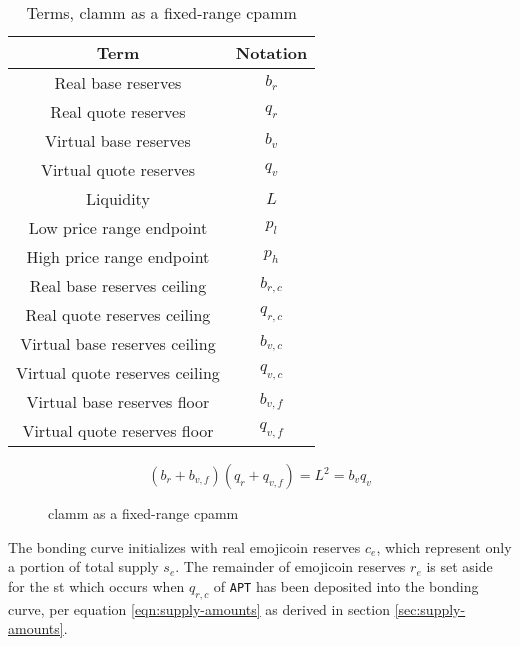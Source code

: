 \documentclass[table, twocolumn]{article}
\begin{document}
\begin{table}[!htb]
  \centering
  \begin{tabular}{|c|c|}
    \hline \rowcolor{blue}
    Term                           & Notation  \\ \hline
    Real base reserves             & $b_r$     \\ \hline
    Real quote reserves            & $q_r$     \\ \hline
    Virtual base reserves          & $b_v$     \\ \hline
    Virtual quote reserves         & $q_v$     \\ \hline
    Liquidity                      & $L$       \\ \hline
    Low price range endpoint       & $p_l$     \\ \hline
    High price range endpoint      & $p_h$     \\ \hline
    Real base reserves ceiling     & $b_{r,c}$ \\ \hline
    Real quote reserves ceiling    & $q_{r,c}$ \\ \hline
    Virtual base reserves ceiling  & $b_{v,c}$ \\ \hline
    Virtual quote reserves ceiling & $q_{v,c}$ \\ \hline
    Virtual base reserves floor    & $b_{v,f}$ \\ \hline
    Virtual quote reserves floor   & $q_{v,f}$ \\ \hline
  \end{tabular}
  \caption{Terms, \gls*{clamm} as a fixed-range \gls*{cpamm}}
  \label{tab:clamm-curve-translation}
\end{table}

\begin{equation} \label{eqn:clamm-curve-translation}
  (b_r + b_{v, f})(q_r + q_{v, f}) = L^2 = b_v q_v
\end{equation}

\begin{figure}[!htb]
  \centering
  
  \caption{\gls*{clamm} as a fixed-range \gls*{cpamm}}
  \label{fig:clamm-curve-translation}
\end{figure}

The bonding curve initializes with real emojicoin reserves $c_e$, which represent only a
portion of total supply $s_e$. The remainder of emojicoin reserves $r_e$ is set aside
for the \gls*{st} which occurs when $q_{r, c}$ of \texttt{APT} has been deposited into
the bonding curve, per equation \ref{eqn:supply-amounts} as derived in section
\ref{sec:supply-amounts}.
\end{document}
